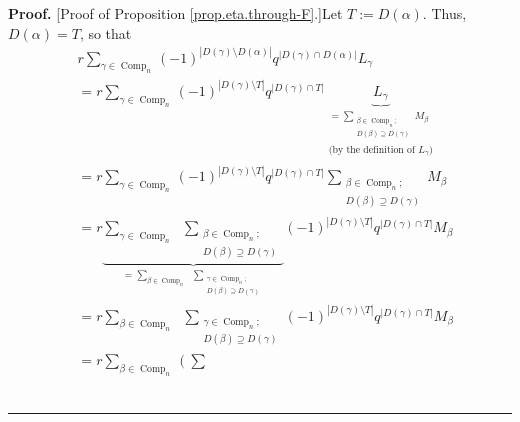 \documentclass[numbers=enddot,12pt,final,onecolumn,notitlepage]{scrartcl}%
\theoremstyle{definition}
\newenvironment{proof}[1][Proof]{\noindent\textbf{#1.} }{\ \rule{0.5em}{0.5em}}
\let\sumnonlimits\sum
\renewcommand{\sum}{\sumnonlimits\limits}
\newenvironment{verlong}{}{}
\begin{document}
\begin{verlong}
\begin{proof}
[Proof of Proposition \ref{prop.eta.through-F}.]Let $T:=D\left(
\alpha\right)  $. Thus, $D\left(  \alpha\right)  =T$, so that%
\begin{align}
&  r\sum_{\gamma\in\operatorname*{Comp}\nolimits_{n}}\left(  -1\right)
^{\left\vert D\left(  \gamma\right)  \setminus D\left(  \alpha\right)
\right\vert }q^{\left\vert D\left(  \gamma\right)  \cap D\left(
\alpha\right)  \right\vert }L_{\gamma}\nonumber\\
&  =r\sum_{\gamma\in\operatorname*{Comp}\nolimits_{n}}\left(  -1\right)
^{\left\vert D\left(  \gamma\right)  \setminus T\right\vert }q^{\left\vert
D\left(  \gamma\right)  \cap T\right\vert }\underbrace{L_{\gamma}%
}_{\substack{=\sum_{\substack{\beta\in\operatorname*{Comp}\nolimits_{n}%
;\\D\left(  \beta\right)  \supseteq D\left(  \gamma\right)  }}M_{\beta
}\\\text{(by the definition of }L_{\gamma}\text{)}}}\nonumber\\
&  =r\sum_{\gamma\in\operatorname*{Comp}\nolimits_{n}}\left(  -1\right)
^{\left\vert D\left(  \gamma\right)  \setminus T\right\vert }q^{\left\vert
D\left(  \gamma\right)  \cap T\right\vert }\sum_{\substack{\beta
\in\operatorname*{Comp}\nolimits_{n};\\D\left(  \beta\right)  \supseteq
D\left(  \gamma\right)  }}M_{\beta}\nonumber\\
&  =r\underbrace{\sum_{\gamma\in\operatorname*{Comp}\nolimits_{n}}%
\ \ \sum_{\substack{\beta\in\operatorname*{Comp}\nolimits_{n};\\D\left(
\beta\right)  \supseteq D\left(  \gamma\right)  }}}_{=\sum_{\beta
\in\operatorname*{Comp}\nolimits_{n}}\ \ \sum_{\substack{\gamma\in
\operatorname*{Comp}\nolimits_{n};\\D\left(  \beta\right)  \supseteq D\left(
\gamma\right)  }}}\left(  -1\right)  ^{\left\vert D\left(  \gamma\right)
\setminus T\right\vert }q^{\left\vert D\left(  \gamma\right)  \cap
T\right\vert }M_{\beta}\nonumber\\
&  =r\sum_{\beta\in\operatorname*{Comp}\nolimits_{n}}\ \ \sum
_{\substack{\gamma\in\operatorname*{Comp}\nolimits_{n};\\D\left(
\beta\right)  \supseteq D\left(  \gamma\right)  }}\left(  -1\right)
^{\left\vert D\left(  \gamma\right)  \setminus T\right\vert }q^{\left\vert
D\left(  \gamma\right)  \cap T\right\vert }M_{\beta}\nonumber\\
&  =r\sum_{\beta\in\operatorname*{Comp}\nolimits_{n}}\left(  \sum

\end{align}
\end{proof}
\end{verlong}
\end{document}
